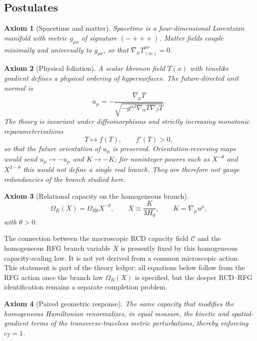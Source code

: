 \documentclass[11pt,a4paper]{article}
\newtheorem{axiom}{Axiom}[section]
\newcommand{\C}{\mathcal{C}}
\begin{document}
\subsection{Postulates}

\begin{axiom}[Spacetime and matter]
Spacetime is a four-dimensional Lorentzian manifold with metric \(g_{\mu\nu}\) of signature \((-+++)\). Matter fields couple minimally and universally to \(g_{\mu\nu}\), so that \(\nabla_\mu T^{\mu\nu}_{(m)}=0\).
\end{axiom}

\begin{axiom}[Physical foliation]
A scalar khronon field \(T(x)\) with timelike gradient defines a physical ordering of hypersurfaces. The future-directed unit normal is
\[
u_\mu=-\frac{\nabla_\mu T}{\sqrt{-g^{\alpha\beta}\nabla_\alpha T\nabla_\beta T}}.
\]
The theory is invariant under diffeomorphisms and strictly increasing monotonic reparameterizations
\[
T\mapsto f(T),\qquad f'(T)>0,
\]
so that the future orientation of \(u_\mu\) is preserved. Orientation-reversing maps would send \(u_\mu\to-u_\mu\) and \(K\to-K\); for noninteger powers such as \(X^{-\theta}\) and \(X^{2-\theta}\) this would not define a single real branch. They are therefore not gauge redundancies of the branch studied here.
\end{axiom}

\begin{axiom}[Relational capacity on the homogeneous branch]
\[
\Omega_R(X)=\Omega_{R0}X^{-\theta},\qquad X\equiv\frac{K}{3H_0},\qquad K=\nabla_\mu u^\mu,
\]
with \(\theta>0\).
\end{axiom}

The connection between the macroscopic RCD capacity field \(\C\) and the homogeneous RFG branch variable \(X\) is presently fixed by this homogeneous capacity-scaling law. It is not yet derived from a common microscopic action. This statement is part of the theory ledger: all equations below follow from the RFG action once the branch law \(\Omega_R(X)\) is specified, but the deeper RCD--RFG identification remains a separate completion problem.

\begin{axiom}[Paired geometric response]
The same capacity that modifies the homogeneous Hamiltonian renormalizes, in equal measure, the kinetic and spatial-gradient terms of the transverse-traceless metric perturbations, thereby enforcing \(c_T=1\).
\end{axiom}
\end{document}
